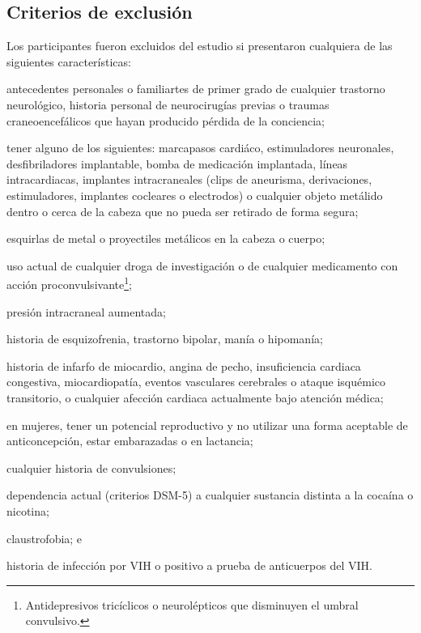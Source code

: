 \subsection{Criterios de exclusión}
Los participantes fueron excluidos del estudio si presentaron cualquiera de las siguientes características:
\begin{enumerate*}[label=\emph{\alph*})]
    \item antecedentes personales o familiartes de primer grado de cualquier trastorno neurológico, historia personal de neurocirugías previas o traumas craneoencefálicos que hayan producido pérdida de la conciencia;
    \item tener alguno de los siguientes: marcapasos cardiáco, estimuladores neuronales, desfibriladores implantable, bomba de medicación implantada, líneas intracardiacas, implantes intracraneales (clips de aneurisma, derivaciones, estimuladores, implantes cocleares o electrodos) o cualquier objeto metálido dentro o cerca de la cabeza que no pueda ser retirado de forma segura;
    \item esquirlas de metal o proyectiles metálicos en la cabeza o cuerpo;
    \item uso actual de cualquier droga de investigación o de cualquier medicamento con acción proconvulsivante\footnote{Antidepresivos tricíclicos o neurolépticos que disminuyen el umbral convulsivo.};
    \item presión intracraneal aumentada;
    \item historia de esquizofrenia, trastorno bipolar, manía o hipomanía;
    \item historia de infarfo de miocardio, angina de pecho, insuficiencia cardiaca congestiva, miocardiopatía, eventos vasculares cerebrales o ataque isquémico transitorio, o cualquier afección cardiaca actualmente bajo atención médica;
    \item en mujeres, tener un potencial reproductivo y no utilizar una forma aceptable de anticoncepción, estar embarazadas o en lactancia;
    \item cualquier historia de convulsiones;
    \item dependencia actual (criterios DSM-5) a cualquier sustancia distinta a la cocaína o nicotina;
    \item claustrofobia; e
    \item historia de infección por VIH o positivo a prueba de anticuerpos del VIH.
\end{enumerate*}

